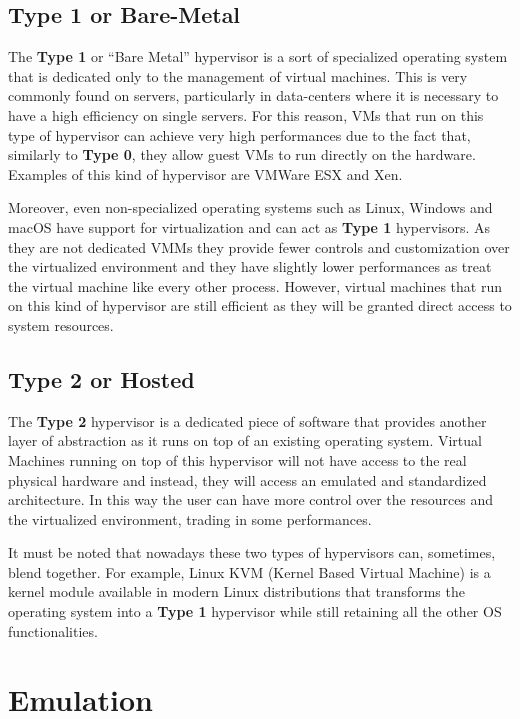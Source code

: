 \subsection{Type 1 or Bare-Metal}

The \textbf{Type 1} or ``Bare Metal'' hypervisor is a sort of specialized operating system that is dedicated only to the management of virtual machines. This is very commonly found on servers, particularly in data-centers where it is necessary to have a high efficiency on single servers. For this reason, VMs that run on this type of hypervisor can achieve very high performances due to the fact that, similarly to \textbf{Type 0}, they allow guest VMs to run directly on the hardware. Examples of this kind of hypervisor are VMWare ESX and Xen.

Moreover, even non-specialized operating systems such as Linux, Windows and macOS have support for virtualization and can act as \textbf{Type 1} hypervisors. As they are not dedicated VMMs they provide fewer controls and customization over the virtualized environment and they have slightly lower performances as treat the virtual machine like every other process. However, virtual machines that run on this kind of hypervisor are still efficient as they will be granted direct access to system resources. 

\subsection{Type 2 or Hosted}

The \textbf{Type 2 }hypervisor is a dedicated piece of software that provides another layer of abstraction as it runs on top of an existing operating system. Virtual Machines running on top of this hypervisor will not have access to the real physical hardware and instead, they will access an emulated and standardized architecture. In this way the user can have more control over the resources and the virtualized environment, trading in some performances. 

It must be noted that nowadays these two types of hypervisors can, sometimes, blend together. For example, Linux KVM (Kernel Based Virtual Machine) is a kernel module available in modern Linux distributions that transforms the operating system into a \textbf{Type 1} hypervisor while still retaining all the other OS functionalities.


\section{Emulation}

